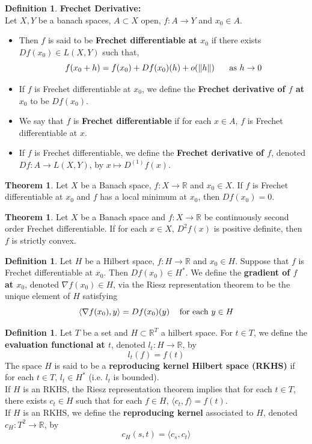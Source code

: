 \documentclass{article}
\theoremstyle{definition}
\newtheorem{defn}[definition]{Definition}
\newtheorem{thm}[definition]{Theorem}
\newcommand{\R}{\mathbb{R}}
\renewcommand{\r}{\rangle}
\renewcommand{\l}{\langle}
\begin{document}
\begin{defn} \textbf{Frechet Derivative:} \\
	Let $X, Y$ be a banach spaces, $A \subset X$ open, $f:A \rightarrow Y$ and $x_0 \in A$. 
	\begin{itemize}
	\item Then $f$ is said to be \textbf{ Frechet differentiable at $x_0$} if there exists $Df(x_0) \in L(X,Y)$ such that, $$f(x_0 + h) = f(x_0) + Df(x_0)(h) + o(\|h\| ) \hspace{.5cm} \text{ as } h \rightarrow 0$$  
	\item If $f$ is Frechet differentiable at $x_0$, we define the \textbf{ Frechet derivative of $f$ at $x_0$} to be $Df(x_0)$. 
	\item We say that $f$ is \textbf{ Frechet differentiable} if for each $x \in A$, $f$ is Frechet differentiable at $x$. 
	\item If $f$ is Frechet differentiable, we define the \textbf{ Frechet derivative of $f$}, denoted $Df:A \rightarrow L(X, Y)$, by $x \mapsto D^{(1)}f(x)$. 
	\end{itemize}
	\end{defn}
	
	\begin{thm}
	Let $X$ be a Banach space, $f:X \rightarrow \R$ and $x_0 \in X$. If $f$ is Frechet differentiable at $x_0$ and $f$ has a local minimum at $x_0$, then $Df(x_0) = 0$. 
	\end{thm}
	
	\begin{thm}
Let $X$ be a Banach space and $f:X \rightarrow \R$ be continuously second order Frechet differentiable. If for each $x \in X$, $D^2f(x)$ is positive definite, then $f$ is strictly convex.
\end{thm}

\begin{defn} 
	Let $H$ be a Hilbert space, $f: H \rightarrow \R$ and $x_0 \in H$. Suppose that $f$ is Frechet differentiable at $x_0$. Then $Df(x_0) \in H^*$. We define the \textbf{gradient of $f$ at $x_0$}, denoted $\nabla f(x_0) \in H$, via the Riesz representation theorem to be the unique element of $H$ satisfying $$\l \nabla f(x_0), y \r = Df(x_0)(y) \hspace{.3cm} \text{ for each } y \in H$$
	\end{defn}


\begin{defn}
Let $T$ be a set and $H \subset \R^T$ a hilbert space. For $t \in T$, we define the \textbf{evaluation functional at $t$}, denoted $l_t : H \rightarrow \R$, by $$l_t(f) = f(t)$$ 
The space $H$ is said to be a \textbf{reproducing kernel Hilbert space (RKHS)} if for each $t \in T$, $l_t \in H^*$ (i.e. $l_t$ is bounded). \\
If $H$ is an RKHS, the Riesz representation theorem implies that for each $t \in T$, there exists $c_t \in H$ such that for each $f \in H$, $\l c_t, f\r = f(t)$. \\

If $H$ is an RKHS, we define the \textbf{reproducing kernel} associated to $H$, denoted $c_H:T^2 \rightarrow \R$, by $$c_H(s,t) = \l c_s, c_t \r$$ 
\end{defn}
	
\end{document}
